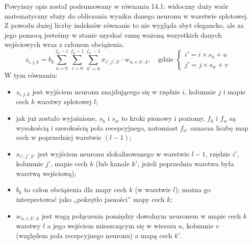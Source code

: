 \documentclass[12pt]{mwbk}
\theoremstyle{plain}
\theoremstyle{definition}
\theoremstyle{remark}
\begin{document}
Powyższy opis został podsumowany w równaniu 14.1: widoczny duży wzór matematyczny służy
do obliczania wyniku danego neuronu w warstwie splotowej. Z powodu dużej liczby indeksów
równanie to nie wygląda zbyt elegancko, ale za jego pomocą jesteśmy w stanie uzyskać sumę ważoną
wszystkich danych wejściowych wraz z członem obciążenia.
$$z_{i,j,k}=b_k\sum_{u=0}^{f_h-1}\sum_{v=0}^{f_w-1}\sum_{k'=0}^{f_{n'}-1}x_{i', j', k'} \cdot w_{u,v,k', k},\text{~~~gdzie }\begin{cases}
i'=i \times s_h+u\\
j'=j \times s_w+v
\end{cases}$$
W tym równaniu:
\begin{itemize}
	\item $z_{i,j,k}$ jest wyjściem neuronu znajdującego się w rzędzie $i$, kolumnie $j$ i mapie cech $k$ warstwy
	splotowej $l$;
	\item jak już zostało wyjaśnione, $s_h$ i $s_w$ to kroki pionowy i poziomy, $f_h$ i $f_w$ są wysokością i szerokością
	pola recepcyjnego, natomiast $f_{n'}$ oznacza liczbę map cech w poprzedniej warstwie $(l-1)$;
	\item $x_{i',j',k'}$ jest wyjściem neuronu zlokalizowanego w warstwie $l-1$, rzędzie $i'$, kolumnie $j'$, mapie
	cech $k$ (lub kanale $k'$, jeżeli poprzednia warstwa była warstwą wejściową);
	\item $b_k$ to człon obciążenia dla mapy cech $k$ (w warstwie $l$); można go interpretować jako „pokrętło
	jasności” mapy cech $k$;
	\item $w_{u,v,k',k}$ jest wagą połączenia pomiędzy dowolnym neuronem w mapie cech $k$ warstwy $l$ a jego
	wejściem mieszczącym się w wierszu $u$, kolumnie $v$ (względem pola recepcyjnego neuronu)
	a mapą cech $k'$.
\end{itemize}
\end{document}
